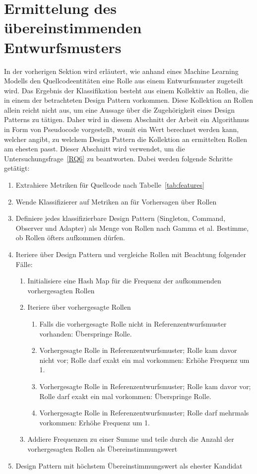 \section{Ermittelung des übereinstimmenden Entwurfsmusters}\label{pattern}

In der vorherigen Sektion wird erläutert, wie anhand eines Machine Learning Modells den Quellcodeentitäten eine Rolle aus einem Entwurfsmuster zugeteilt wird.
Das Ergebnis der Klassifikation besteht aus einem Kollektiv an Rollen, die in einem der betrachteten Design Pattern vorkommen. Diese Kollektion an Rollen allein reicht nicht aus, um eine Aussage über die Zugehörigkeit eines Design Patterns zu tätigen.
Daher wird in diesem Abschnitt der Arbeit ein Algorithmus in Form von Pseudocode vorgestellt, womit ein Wert berechnet werden kann, welcher angibt, zu welchem Design Pattern die Kollektion an ermittelten Rollen am ehesten passt.
Dieser Abschnitt wird verwendet, um die Untersuchungsfrage~\ref{RQ6} zu beantworten. Dabei werden folgende Schritte getätigt:

\begin{enumerate}
    \item Extrahiere Metriken für Quellcode nach Tabelle~\ref{tab:features}
    \item Wende Klassifizierer auf Metriken an für Vorhersagen über Rollen
    \item Definiere jedes klassifizierbare Design Pattern (Singleton, Command, Observer und Adapter) als Menge von Rollen nach Gamma et al. Bestimme, ob Rollen öfters aufkommen dürfen.
    \item Iteriere über Design Pattern und vergleiche Rollen mit Beachtung folgender Fälle:
        \begin{enumerate}
            \item Initialisiere eine Hash Map für die Frequenz der aufkommenden vorhergesagten Rollen
            \item Iteriere über vorhergesagte Rollen
            \begin{enumerate}
                \item Falls die vorhergesagte Rolle nicht in Referenzentwurfsmuster vorhanden: Überspringe Rolle.
                \item Vorhergesagte Rolle in Referenzentwurfsmuster; Rolle kam davor nicht vor; Rolle darf exakt ein mal vorkommen: Erhöhe Frequenz um 1.
                \item Vorhergesagte Rolle in Referenzentwurfsmuster; Rolle kam davor vor; Rolle darf exakt ein mal vorkommen: Überspringe Rolle.
                \item Vorhergesagte Rolle in Referenzentwurfsmuster; Rolle darf mehrmals vorkommen: Erhöhe Frequenz um 1.
            \end{enumerate}
            \item Addiere Frequenzen zu einer Summe und teile durch die Anzahl der vorhergesagten Rollen als Übereinstimmungswert
        \end{enumerate}    
     \item Design Pattern mit höchstem Übereinstimmungswert als ehester Kandidat
\end{enumerate}